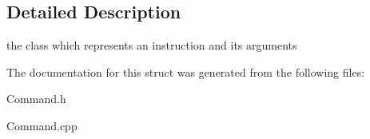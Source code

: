 \subsection{Detailed Description}
the class which represents an instruction and its arguments 

The documentation for this struct was generated from the following files\+:\begin{DoxyCompactItemize}
\item 
Command.\+h\item 
Command.\+cpp\end{DoxyCompactItemize}
